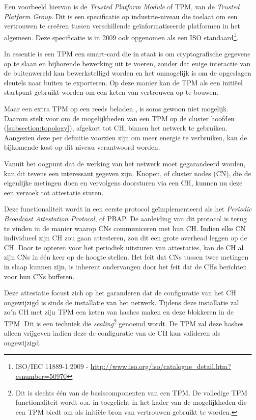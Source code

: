 Een voorbeeld hiervan is de \emph{Trusted Platform Module} of TPM, van de
\emph{Trusted Platform Group}. Dit is een specificatie op industrie-niveau die
toelaat om een vertrouwen te cre\"eren tussen verschillende ge\"informatiseerde
platformen in het algemeen. Deze specificatie is in 2009 ook opgenomen als een
ISO standaard\footnote{ISO/IEC 11889-1:2009 -
\url{http://www.iso.org/iso/catalogue_detail.htm?csnumber=50970}}.

In essentie is een TPM een smart-card die in staat is om cryptografische
gegevens op te slaan en bijhorende bewerking uit te voeren, zonder dat enige
interactie van de buitenwereld kan bewerkstelligd worden en het onmogelijk is
om de opgeslagen sleutels naar buiten te exporteren. Op deze manier kan de TPM
als een initi\"eel startpunt gebruikt worden om een keten van vertrouwen op te
bouwen.

Maar een extra TPM op een reeds beladen \mcu, is soms gewoon niet mogelijk.
Daarom stelt \cite{krauss2007detecting} voor om de mogelijkheden van een TPM op
de cluster hoofden (\ref{subsection:topology}), afgekort tot CH, binnen het
netwerk te gebruiken. Aangezien deze per definitie voorzien zijn om meer
energie te verbruiken, kan de bijkomende kost op dit niveau verantwoord worden.

Vanuit het oogpunt dat de werking van het netwerk moet gegarandeerd worden, kan
dit tevens een interessant gegeven zijn. Knopen, of cluster nodes (CN), die de
eigenlijke metingen doen en vervolgens doorsturen via een CH, kunnen nu deze
een verzoek tot attestatie sturen.

Deze functionaliteit wordt in een eerste protocol ge\"implementeerd als het
\emph{Periodic Broadcast Attestation Protocol}, of PBAP. De aanleiding van dit
protocol is terug te vinden in de manier waarop CNs communiceren met hun CH.
Indien elke CN individueel zijn CH zou gaan attesteren, zou dit een grote
overhead leggen op de CH. Door te opteren voor het periodiek uitsturen van
attestaties, kan de CH al zijn CNs in \'e\'en keer op de hoogte stellen. Het
feit dat CNs tussen twee metingen in slaap kunnen zijn, is inherent ondervangen
door het feit dat de CHs berichten voor hun CNs bufferen.

Deze attestatie focust zich op het garanderen dat de configuratie van het CH
ongewijzigd is sinds de installatie van het netwerk. Tijdens deze installatie
zal zo'n CH met zijn TPM een keten van hashes maken en deze blokkeren in de
TPM. Dit is een techniek die \emph{sealing}\footnote{Dit is slechts \'e\'en van
de basiscomponenten van een TPM. De volledige TPM functionaliteit wordt o.a. in
\cite{parno2010bootstrapping} toegelicht in het kader van de mogelijkheden die
een TPM biedt om als initi\"ele bron van vertrouwen gebruikt te worden.}
genoemd wordt. De TPM zal deze hashes alleen vrijgeven indien deze de
configuratie van de CH kan valideren als ongewijzigd.

